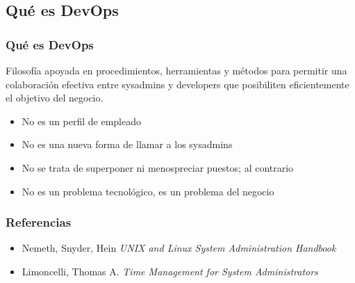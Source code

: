 \documentclass{beamer}
\begin{document}

\subsection{Qué es DevOps}

\begin{frame}
  \frametitle{Qué es DevOps}
  \begin{block}{}
    Filosofía apoyada en procedimientos, herramientas y métodos para permitir una colaboración efectiva entre sysadmins y developers que posibiliten eficientemente el objetivo del negocio.
  \end{block}
  \begin{itemize}
    \item No es un perfil de empleado
    \item No es una nueva forma de llamar a los sysadmins
    \item No se trata de superponer ni menospreciar puestos; al contrario
    \item No es un problema tecnológico, es un problema del negocio
  \end{itemize}
\end{frame}


\begin{frame}
\frametitle{Referencias}

\begin{itemize}
\item Nemeth, Snyder, Hein \textit{UNIX and Linux System Administration Handbook}
\item Limoncelli, Thomas A. \textit{Time Management for System Administrators} 
\end{itemize}

\end{frame}


\end{document}
